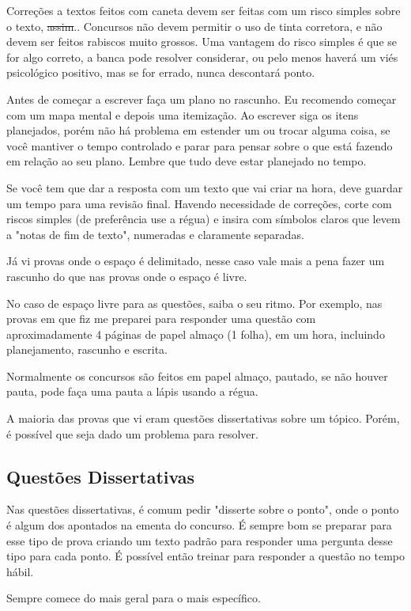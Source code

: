 \documentclass[12pt]{article}
\begin{document}
Correções a textos feitos com caneta devem ser feitas com um risco simples sobre o texto, \st{assim}.. Concursos não devem permitir o uso de tinta corretora, e não devem ser feitos rabiscos muito grossos. Uma vantagem do risco simples é que se for algo correto, a banca pode resolver considerar, ou pelo menos haverá um viés psicológico positivo, mas se for errado, nunca descontará ponto.

Antes de começar a escrever faça um plano no rascunho. Eu recomendo começar com um mapa mental e depois uma itemização. Ao escrever siga os itens planejados, porém não há problema em estender um ou trocar alguma coisa, se você mantiver o tempo controlado e parar para pensar sobre o que está fazendo em relação ao seu plano. Lembre que tudo deve estar planejado no tempo.

Se você tem que dar a resposta com um texto que vai criar na hora, deve guardar um tempo para uma revisão final. Havendo necessidade de correções, corte com riscos simples (de preferência use a régua) e insira com símbolos claros que levem a "notas de fim de texto", numeradas e claramente separadas.

Já vi provas onde o espaço é delimitado, nesse caso vale mais a  pena fazer um rascunho do que nas provas onde o espaço é livre.

No caso de espaço livre para as questões, saiba o seu ritmo. Por exemplo, nas provas em que fiz me preparei para responder uma questão com aproximadamente 4 páginas de papel almaço (1 folha), em um hora, incluindo planejamento, rascunho e escrita.

Normalmente os concursos são feitos em papel almaço, pautado, se não houver pauta, pode faça uma pauta a lápis usando a régua.

A maioria das provas que vi eram questões dissertativas sobre um tópico. Porém, é possível que seja dado um problema para resolver.

\subsection{Questões Dissertativas}

Nas questões dissertativas, é comum pedir "disserte sobre o ponto", onde o ponto é algum dos apontados na ementa do concurso.
É sempre bom se preparar para esse tipo de prova criando um texto padrão para responder uma pergunta desse tipo para cada ponto.
É possível então treinar para responder a questão no tempo hábil.

Sempre comece do mais geral para o mais específico.
\end{document}
